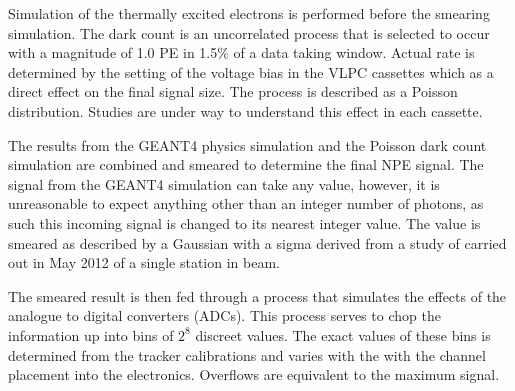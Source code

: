   Simulation of the thermally excited electrons is performed before the smearing simulation.  The dark count is an uncorrelated process that is selected to occur with a magnitude of 1.0 PE in 1.5$\%$ of a data taking window.  Actual rate is determined by the setting of the voltage bias in the VLPC cassettes which as a direct effect on the final signal size.  The process is described as a Poisson distribution.  Studies are under way to understand this effect in each cassette. 
  
  The results from the GEANT4 physics simulation and the Poisson dark count simulation are combined and smeared to determine the final NPE signal.  The signal from the GEANT4 simulation can take any value, however, it is unreasonable to expect anything other than an integer number of photons, as such this incoming signal is changed to its nearest integer value. The value is smeared as described by a Gaussian with a sigma derived from a study of carried out in May 2012 of a single station in beam.
  
  The smeared result is then fed through a process that simulates the effects of the analogue to digital converters (ADCs).  This process serves to chop the information up into bins of $2^8$ discreet values.  The exact values of these bins is determined from the tracker calibrations and varies with the with the channel placement into the electronics.  Overflows are equivalent to the maximum signal.  